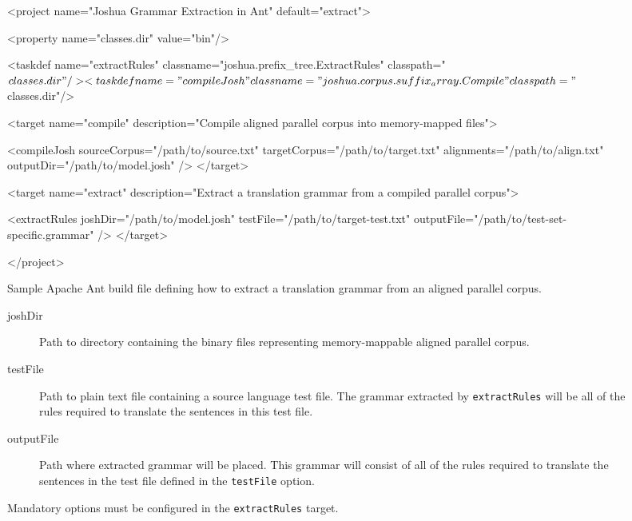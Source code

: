 \documentclass{pbml}
\begin{document}
\begin{figure}
\begin{verbatimtab}[4]
<project name="Joshua Grammar Extraction in Ant" default="extract">
    
	<property name="classes.dir" value="bin"/>
 	
	<taskdef name="extractRules" 
		classname="joshua.prefix_tree.ExtractRules" 
		classpath="${classes.dir}"/>
	
	<taskdef name="compileJosh" 
		classname="joshua.corpus.suffix_array.Compile" 
		classpath="${classes.dir}"/>
	
	<target name="compile" 
		description="Compile aligned parallel corpus
			 into memory-mapped files">
		
		<compileJosh
			sourceCorpus="/path/to/source.txt"
			targetCorpus="/path/to/target.txt"
			alignments="/path/to/align.txt"
			outputDir="/path/to/model.josh"
		/>
	</target>
	
	<target name="extract" 
		description="Extract a translation grammar 
			from a compiled parallel corpus">
		
		<extractRules 
			joshDir="/path/to/model.josh" 
			testFile="/path/to/target-test.txt" 
			outputFile="/path/to/test-set-specific.grammar"
		/>    
	</target>
	
</project>
\end{verbatimtab}
\caption{Sample Apache Ant build file defining how to extract a translation grammar from an aligned parallel corpus.}
\end{figure}


\begin{figure}
\begin{description}

	\item[joshDir] Path to directory containing the binary files representing memory-mappable aligned parallel corpus.

	\item[testFile] Path to plain text file containing a source language test file. The grammar extracted by {\tt extractRules} will be all of the rules required to translate the sentences in this test file.

	\item[outputFile] Path where extracted grammar will be placed. This grammar will consist of all of the rules required to translate the sentences in the test file defined in the {\tt testFile} option.
\end{description}
\caption{Mandatory options must be configured in the {\tt extractRules} target.}
\end{figure}
\end{document}
